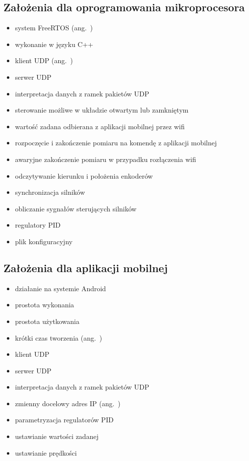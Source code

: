 \subsection*{Założenia dla oprogramowania mikroprocesora}
\begin{itemize}
    \item system FreeRTOS (ang.~)
    \item wykonanie w języku C++
    \item klient UDP (ang.~)
    \item serwer UDP
    \item interpretacja danych z ramek pakietów UDP
    \item sterowanie możliwe w układzie otwartym lub zamkniętym
    \item wartość zadana odbierana z aplikacji mobilnej przez wifi
    \item rozpoczęcie i zakończenie pomiaru na komendę z aplikacji mobilnej
    \item awaryjne zakończenie pomiaru w przypadku rozłączenia wifi
    \item odczytywanie kierunku i położenia enkoderów
    \item synchronizacja silników
    \item obliczanie sygnałów sterujących silników
    \item regulatory PID
    \item plik konfiguracyjny
\end{itemize}

\subsection*{Założenia dla aplikacji mobilnej}
\begin{itemize}
    \item działanie na systemie Android
    \item prostota wykonania
    \item prostota użytkowania
    \item krótki czas tworzenia (ang.~)
    \item klient UDP
    \item serwer UDP
    \item interpretacja danych z ramek pakietów UDP
    \item zmienny docelowy adres IP (ang.~) 
    \item parametryzacja regulatorów PID
    \item ustawianie wartości zadanej
    \item ustawianie prędkości
\end{itemize}

